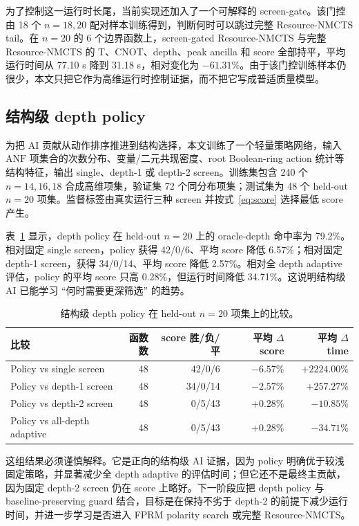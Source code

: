 \documentclass[UTF8,fontset=macnew,11pt]{ctexart}
\newcommand{\method}{Resource-NMCTS}
\newcommand{\anf}{\ensuremath{\mathrm{ANF}}}
\begin{document}
为了控制这一运行时长尾，当前实现还加入了一个可解释的 screen-gate。该门控由 18 个 $n=18,20$ 配对样本训练得到，判断何时可以跳过完整 \method{} tail。在 $n=20$ 的 6 个边界函数上，screen-gated \method{} 与完整 \method{} 的 T、CNOT、depth、peak ancilla 和 score 全部持平，平均运行时间从 77.10 s 降到 31.18 s，相对变化为 $-61.31\%$。由于该门控训练样本仍很少，本文只把它作为高维运行时控制证据，而不把它写成普适质量模型。

\subsection{结构级 depth policy}

为把 AI 贡献从动作排序推进到结构选择，本文训练了一个轻量策略网络，输入 \anf{} 项集合的次数分布、变量/二元共现密度、root Boolean-ring action 统计等结构特征，输出 single、depth-1 或 depth-2 screen。训练集包含 240 个 $n=14,16,18$ 合成高维项集，验证集 72 个同分布项集；测试集为 48 个 held-out $n=20$ 项集。监督标签由真实运行三种 screen 并按式~\eqref{eq:score} 选择最低 score 产生。

表~\ref{tab:depth_policy} 显示，depth policy 在 held-out $n=20$ 上的 oracle-depth 命中率为 79.2\%。相对固定 single screen，policy 获得 42/0/6、平均 score 降低 6.57\%；相对固定 depth-1 screen，获得 34/0/14、平均 score 降低 2.57\%。相对全 depth adaptive 评估，policy 的平均 score 只高 0.28\%，但运行时间降低 34.71\%。这说明结构级 AI 已能学习 ``何时需要更深筛选'' 的趋势。

\begin{table}[t]
\centering
\small
\caption{结构级 depth policy 在 held-out $n=20$ 项集上的比较。}
\label{tab:depth_policy}
\begin{tabular}{lrrrr}
\toprule
比较 & 函数数 & score 胜/负/平 & 平均 $\Delta$ score & 平均 $\Delta$ time \\
\midrule
Policy vs single screen & 48 & 42/0/6 & $-6.57\%$ & $+2224.00\%$ \\
Policy vs depth-1 screen & 48 & 34/0/14 & $-2.57\%$ & $+257.27\%$ \\
Policy vs depth-2 screen & 48 & 0/5/43 & $+0.28\%$ & $-10.85\%$ \\
Policy vs all-depth adaptive & 48 & 0/5/43 & $+0.28\%$ & $-34.71\%$ \\
\bottomrule
\end{tabular}
\end{table}

这组结果必须谨慎解释。它是正向的结构级 AI 证据，因为 policy 明确优于较浅固定策略，并显著减少全 depth adaptive 的评估时间；但它还不是最终主贡献，因为固定 depth-2 screen 仍在 score 上略好。下一阶段应把 depth policy 与 baseline-preserving guard 结合，目标是在保持不劣于 depth-2 的前提下减少运行时间，并进一步学习是否进入 FPRM polarity search 或完整 \method{}。
\end{document}
